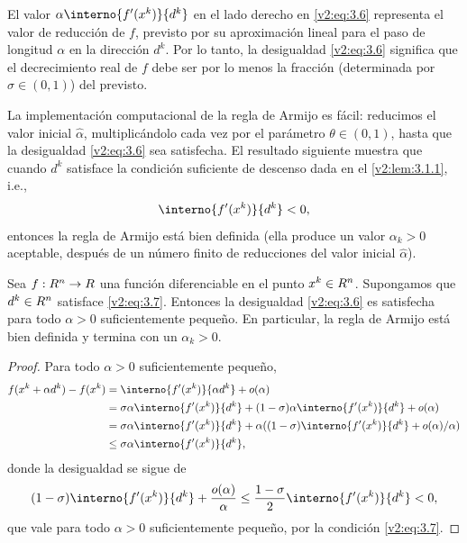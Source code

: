 El valor $\alpha \interno{f'(x^k)}{d^k}$ en el lado derecho en \eqref{v2:eq:3.6} representa el valor de reducción de $f$, previsto por su aproximación lineal para el paso de longitud $\alpha$ en la dirección $d^k$. Por lo tanto, la desigualdad \eqref{v2:eq:3.6} significa que el decrecimiento real de $f$ debe ser por lo menos la fracción (determinada por $\sigma \in (0, 1)$) del previsto.

La implementación computacional de la regla de Armijo es fácil: reducimos el valor inicial $\hat{\alpha}$, multiplicándolo cada vez por el parámetro $\theta \in (0, 1)$, hasta que la desigualdad \eqref{v2:eq:3.6} sea satisfecha.
El resultado siguiente muestra que cuando $d^k$ satisface la condición suficiente de descenso dada en el \cref{v2:lem:3.1.1}, i.e.,
\begin{equation}
    \interno{f'(x^k)}{d^k} < 0,
    \label{v2:eq:3.7}
\end{equation}
entonces la regla de Armijo está bien definida (ella produce un valor $\alpha_k > 0$ aceptable, después de un número finito de reducciones del valor inicial $\hat{\alpha}$).

\begin{lemma}\label{v2:lem:3.1.2}
    Sea $f : R^n \to R$ una función diferenciable en el punto $x^k \in R^n$. Supongamos que $d^k \in R^n$ satisface \eqref{v2:eq:3.7}.
    Entonces la desigualdad \eqref{v2:eq:3.6} es satisfecha para todo $\alpha > 0$ suficientemente pequeño. En particular, la regla de Armijo está bien definida y termina con un $\alpha_k > 0$.
\end{lemma}

\begin{proof}
    Para todo $\alpha > 0$ suficientemente pequeño,
    \begin{align*}
        f(x^k + \alpha d^k) - f(x^k) &= \interno{f'(x^k)}{\alpha d^k} + o(\alpha) \\
        &= \sigma \alpha \interno{f'(x^k)}{d^k} + (1 - \sigma) \alpha \interno{f'(x^k)}{d^k} + o(\alpha) \\
        &= \sigma \alpha \interno{f'(x^k)}{d^k} + \alpha ((1 - \sigma)\interno{f'(x^k)}{d^k} + o(\alpha)/\alpha) \\
        &\le \sigma \alpha \interno{f'(x^k)}{d^k},
    \end{align*}
    donde la desigualdad se sigue de
    \[
        (1 - \sigma)\interno{f'(x^k)}{d^k} + \frac{o(\alpha)}{\alpha} \le \frac{1 - \sigma}{2} \interno{f'(x^k)}{d^k} < 0,
    \]
    que vale para todo $\alpha > 0$ suficientemente pequeño, por la condición \eqref{v2:eq:3.7}.
\end{proof}

